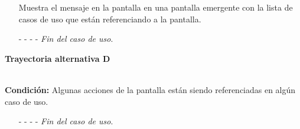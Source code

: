\begin{enumerate}
	\UCpaso[\UCsist] Muestra el mensaje  en la pantalla  en una pantalla emergente con la lista de casos de uso que están referenciando a la pantalla.
	\item[- -] - - {\em {Fin del caso de uso}}.
\end{enumerate}
\hypertarget{CU11-3:TAD}{\textbf{Trayectoria alternativa D}}\\
\noindent \textbf{Condición:} Algunas acciones de la pantalla están siendo referenciadas en algún caso de uso.
\begin{enumerate}
	\UCpaso[\UCsist] Muestra el mensaje  en la pantalla  en una pantalla emergente con la lista de elementos que están referenciando a la acción de la pantalla.
	\item[- -] - - {\em {Fin del caso de uso}}.
\end{enumerate}
	

